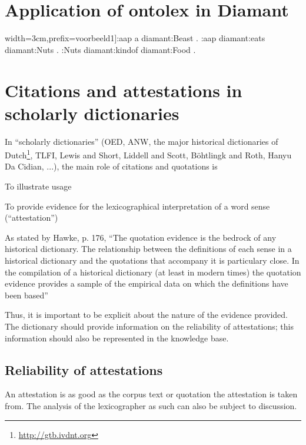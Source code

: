 \documentclass[10pt]{article}
\let\tempeone\enumerate
\let\tempetwo\endenumerate
\renewenvironment{enumerate}{\tempeone\setlength\itemsep{-0.5pt}\setlength{\partopsep}{-0.5pt}\setlength{\parsep}{-0.5pt}\setlength{\topsep}{-0.5pt}}{\tempetwo}
\newenvironment{rdf}[1]{\begingroup\obeylines}{\endgroup}
\begin{document}
\section{Application of ontolex in Diamant}

\begin{rdf}[width=3cm,prefix=voorbeeld1]:aap a diamant:Beast .
:aap diamant:eats diamant:Nuts .
:Nuts diamant:kindof diamant:Food .
\end{rdf}


\section{Citations and attestations in scholarly dictionaries}

In ``scholarly dictionaries'' (OED, ANW, the major historical dictionaries of Dutch\footnote{\url{http://gtb.ivdnt.org}}, TLFI, Lewis and Short, Liddell and Scott, Böhtlingk and Roth, Hanyu Da Cidian, ...), the main role of citations and quotations is 
\begin{enumerate}
    \item To illustrate usage
    \item To provide evidence for the lexicographical interpretation of a word sense (``attestation'')
\end{enumerate}

As stated by Hawke, \cite{Hawke} p. 176, ``The quotation evidence is the bedrock of any historical dictionary. The relationship between the definitions of each sense in a historical dictionary and the quotations that accompany it is particulary close. In the compilation of a historical dictionary (at least in modern times) the quotation evidence provides a sample of the empirical data on which the definitions have been based''

Thus, it is important to be explicit about the nature of the evidence provided. The dictionary should provide information on the reliability of attestations; this information should also be represented in the knowledge base. 

\subsection{Reliability of attestations}



 An attestation is as good as the corpus text or quotation the attestation is taken from. The analysis of the lexicographer as such can also be subject to discussion.\par
\end{document}
